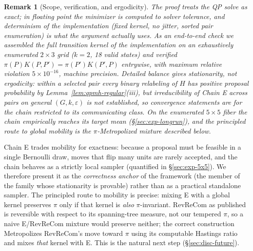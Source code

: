 \documentclass[11pt]{article}
\newtheorem{remark}{Remark}[section]
\begin{document}
\begin{remark}[Scope, verification, and ergodicity]\label{rem:qpmh-scope}
The proof treats the QP solve as exact; in floating point the
minimizer is computed to solver tolerance, and determinism of the
implementation (fixed kernel, no jitter, sorted pair enumeration) is
what the argument actually uses. As an end-to-end check we assembled
the full transition kernel of the implementation on an exhaustively
enumerated $2 \times 3$ grid ($k = 2$, 18 valid states) and verified
$\pi(P)K(P,P') = \pi(P')K(P',P)$ entrywise, with maximum relative
violation $5 \times 10^{-16}$, machine precision. Detailed balance
gives stationarity, not ergodicity: within a selected pair every
binary relabeling of $H$ has positive proposal probability by
Lemma~\ref{lem:qpmh-regular}(iii), but irreducibility of Chain E
across pairs on general $(G, k, \varepsilon)$ is not established, so
convergence statements are for the chain restricted to its
communicating class. On the enumerated $5 \times 5$ fiber the chain
empirically reaches its target mean (\S\ref{sec:exp-longrun}), and
the principled route to global mobility is the $\pi$-Metropolized
mixture described below.
\end{remark}

Chain E trades mobility for exactness: because a proposal must be
feasible in a single Bernoulli draw, moves that flip many units are
rarely accepted, and the chain behaves as a strictly local sampler
(quantified in \S\ref{sec:exp-5x5}). We therefore present it as the
\emph{correctness anchor} of the framework (the member of the family
whose stationarity is provable) rather than as a practical
standalone sampler. The principled route to mobility is precise:
mixing E with a global kernel preserves $\pi$ only if that kernel is
\emph{also} $\pi$-invariant. RevReCom as published is reversible with
respect to its spanning-tree measure, not our tempered $\pi$, so a
naive E/RevReCom mixture would preserve neither; the correct
construction Metropolizes RevReCom's move toward $\pi$ using its
computable Hastings ratio~\cite{cannon2022spanning,autry2023metropolized}
and mixes \emph{that} kernel with E. This is the natural next step
(\S\ref{sec:disc-future}).
\end{document}

